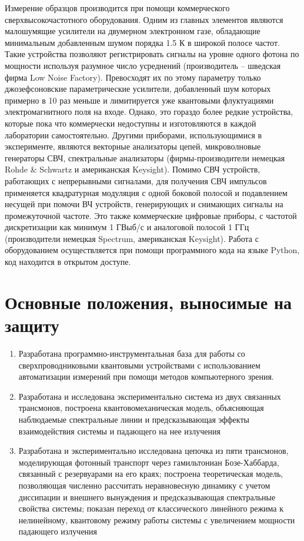 \documentclass[14pt, a4paper]{extreport}
\numberwithin{equation}{section}
\begin{document}
Измерение образцов производится при помощи коммерческого сверхвысокочастотного оборудования. Одним из главных элементов являются малошумящие усилители на двумерном электронном газе, обладающие минимальным добавленным шумом порядка 1.5 К в широкой полосе частот. Такие устройства позволяют регистрировать сигналы на уровне одного фотона по мощности используя разумное число усреднений (производитель -- шведская фирма Low Noise Factory). Превосходят их по этому параметру только джозефсоновские параметрические усилители, добавленный шум которых примерно в 10 раз меньше и лимитируется уже квантовыми флуктуациями электромагнитного поля на входе. Однако, это гораздо более редкие устройства, которые пока что коммерчески недоступны и изготовляются в каждой лаборатории самостоятельно. Другими приборами, использующимися в эксперименте, являются векторные анализаторы цепей, микроволновые генераторы СВЧ, спектральные анализаторы (фирмы-производители немецкая Rohde \& Schwartz и американская Keysight). Помимо СВЧ устройств, работающих с непрерывными сигналами, для получения СВЧ импульсов применяется квадратурная модуляция с одной боковой полосой и подавлением несущей при помочи ВЧ устройств, генерирующих и снимающих сигналы на промежуточной частоте. Это также коммерческие цифровые приборы, с частотой дискретизации как минимум 1 ГВыб/с и аналоговой полосой 1 ГГц (производители немецкая Spectrum, американская Keysight). Работа с оборудованием осуществляется при помощи программного кода на языке Python, код находится в открытом доступе.

\section*{Основные положения, выносимые на защиту}

\begin{enumerate}
	\item Разработана программно-инструментальная база для работы со сверхпроводниковыми квантовыми устройствами с использованием автоматизации измерений при помощи методов компьютерного зрения.
	\item Разработана и исследована экспериментально система из двух связанных трансмонов, построена квантовомеханическая модель, объясняющая наблюдаемые спектральные линии и предсказывающая эффекты взаимодействия системы и падающего на нее излучения
	\item Разработана и экспериментально исследована цепочка из пяти трансмонов, моделирующая фотонный транспорт через гамильтониан Бозе-Хаббарда, связанный с резервуарами на его краях; построена теоретическая модель, позволяющая численно рассчитать неравновесную динамику с учетом диссипации и внешнего вынуждения и предсказывающая спектральные свойства системы; показан переход от классического линейного режима к нелинейному, квантовому режиму работы системы с увеличением мощности падающего излучения
\end{enumerate}
	
\end{document}
